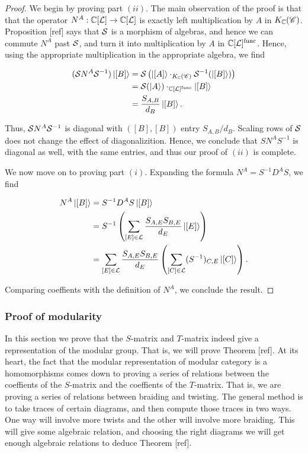 \begin{proof} We begin by proving part $(ii)$. The main observation of the proof is that that the operator $N^{A}:\mathbb{C}[\mathcal{L}]\to\mathbb{C}[\mathcal{L}]$ is exactly left multiplication by $A$ in $K_{\mathbb{C}}(\mathscr{C})$. Proposition [ref] says that $\mathcal{S}$ is a morphism of algebras, and hence we can commute $N^{A}$ past $\mathcal{S}$, and turn it into multiplication by $A$ in $\mathbb{C}[\mathcal{L}]^{\text{func}}$. Hence, using the appropriate multiplication in the appropriate algebra, we find

\begin{align*}
(\mathcal{S} N^{A}\mathcal{S}^{-1}) \ket{[B]} & = \mathcal{S} \left(\ket{[A]} \cdot_{K_{\mathbb{C}}(\mathscr{C})} \mathcal{S}^{-1}(\ket{[B]})\right)\\
& = \mathcal{S}(\ket{A}) \cdot_{\mathbb{C}[\mathcal{L}]^{\text{func}}} \ket{[B]}\\
& = \frac{S_{A,B}}{d_B}\ket{[B]}.
\end{align*}

Thus, $\mathcal{S} N^{A}\mathcal{S}^{-1}$ is diagonal with $([B],[B])$ entry $S_{A,B}/d_B$. Scaling rows of $\mathcal{S}$ does not change the effect of diagonalizition. Hence, we conclude that $S N^{A}S^{-1}$ is diagonal as well, with the same entries, and thus our proof of $(ii)$ is complete.

We now move on to proving part $(i)$. Expanding the formula $N^{A}=S^{-1}D^{A}S$, we find

\begin{align*}
N^{A}\ket{[B]} &= S^{-1}D^{A}S \ket{[B]}\\
&=S^{-1}\left(\sum_{[E]\in\mathcal{L}}\frac{S_{A,E} S_{B,E}}{d_E}\ket{[E]}\right)\\
&=\sum_{[E]\in\mathcal{L}}\frac{S_{A,E} S_{B,E}}{d_E}\left(\sum_{[C]\in \mathcal{L}}(S^{-1})_{C,E}\ket{[C]}\right).\\
\end{align*}

Comparing coeffients with the definition of $N^{A}$, we conclude the result.

\end{proof}


\subsubsection{Proof of modularity}

In this section we prove that the $S$-matrix and $T$-matrix indeed give a representation of the modular group. That is, we will prove Theorem [ref]. At its heart, the fact that the modular representation of modular category is a homomorphisms comes down to proving a series of relations between the coeffients of the $S$-matrix and the coeffients of the $T$-matrix. That is, we are proving a series of relations between braiding and twisting. The general method is to take traces of certain diagrams, and then compute those traces in two ways. One way will involve more twists and the other will involve more braiding. This will give some algebraic relation, and choosing the right diagrams we will get enough algebraic relations to deduce Theorem [ref].

